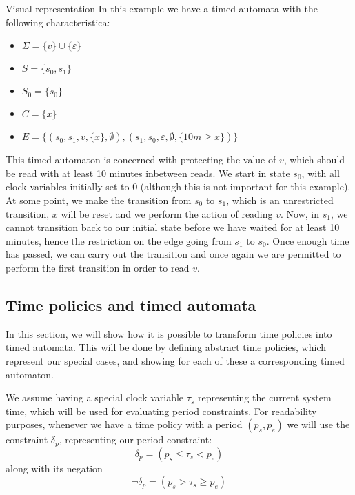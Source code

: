 \begin{example}{Visual representation}\label{time:ex:visualrepresentation}
In this example we have a timed automata with the following characteristica:
\begin{itemize}
  \item $\Sigma = \{ v \} \cup \{ \varepsilon \}$
  \item $S = \{ s_0, s_1 \}$
  \item $S_0 = \{ s_0 \}$
  \item $C = \{ x \}$
  \item $E = \{ (s_0, s_1, v, \{ x \}, \emptyset), (s_1, s_0, \varepsilon, \emptyset, \{ 10m \geq x \})\}$
\end{itemize}
This timed automaton is concerned with protecting the value of $v$, which should be read with at least 10 minutes inbetween reads.
We start in state $s_0$, with all clock variables initially set to $0$ (although this is not important for this example).
At some point, we make the transition from $s_0$ to $s_1$, which is an unrestricted transition, $x$ will be reset and we perform the action of reading $v$.
Now, in $s_1$, we cannot transition back to our initial state before we have waited for at least 10 minutes, hence the restriction on the edge going from $s_1$ to $s_0$.
Once enough time has passed, we can carry out the transition and once again we are permitted to perform the first transition in order to read $v$.

  \begin{figure}[H]
    \centering
    
  \end{figure}
\end{example}

\subsection{Time policies and timed automata}\label{automata:timepolicies}
In this section, we will show how it is possible to transform \thelang{} time policies into timed automata.
This will be done by defining abstract time policies, which represent our special cases, and showing for each of these a corresponding timed automaton.

We assume having a special clock variable $\tau_s$ representing the current system time, which will be used for evaluating period constraints.
For readability purposes, whenever we have a time policy with a period $(p_s, p_e)$ we will use the constraint $\delta_p$, representing our period constraint:
\[ \delta_p = (p_s \leq \tau_s < p_e) \]
along with its negation
\[ \lnot\delta_p = (p_s > \tau_s \geq p_e) \]

